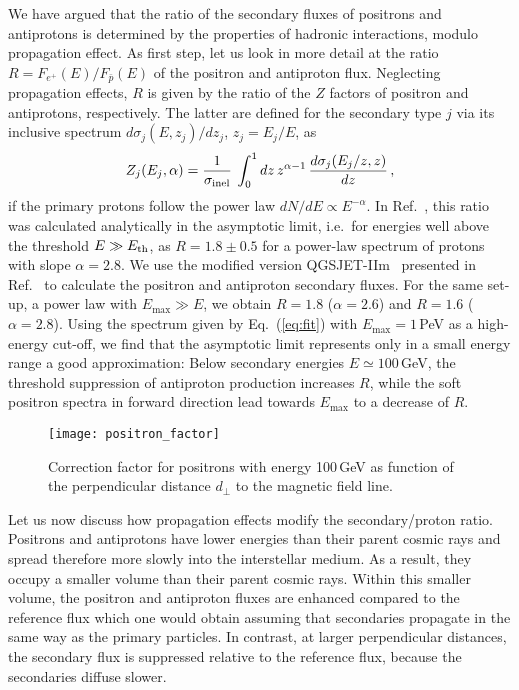\documentclass[prd,aps,twocolumn]{revtex4}
\begin{document}
We have argued that the ratio of the secondary fluxes of positrons and 
antiprotons is determined by the properties of hadronic interactions, 
modulo propagation effect. As first step, 
let us look in more detail at the ratio $R=F_{e^+}(E)/F_{\bar p}(E)$ 
of the positron and antiproton flux. Neglecting propagation effects, $R$ is 
given by the ratio of the $Z$ factors of positron and antiprotons, 
respectively. The latter are defined for the secondary type $j$
via its inclusive spectrum $d\sigma_{j}(E,z_{j})/d z_{j}$, 
$z_{j}=E_{j}/E$, as
%
\begin{equation}
\label{Z_spec}
 Z_{j}(E_{j},\alpha) = \frac{1}{\sigma_{\rm inel}}\:\int_0^1 d z \, z^{\alpha-1}\,
 \frac{d\sigma_{j}(E_{j}/z,z)}{d z}\,,
\end{equation}
%
if the primary protons follow the power law $dN/dE\propto E^{-\alpha}$.
In Ref.~\cite{lipari}, this ratio was calculated  analytically in the 
asymptotic limit, i.e.\ for energies well above the threshold $E\gg E_{\rm th}$, 
as $R=1.8\pm 0.5$  for a power-law spectrum of protons with slope 
$\alpha=2.8$. We use the modified version QGSJET-IIm~\cite{QGS} presented 
in Ref.~\cite{QGSm} to calculate the positron and antiproton secondary fluxes. 
For the same set-up,  a power law with $E_{\max}\gg E$, we obtain 
$R=1.8$ ($\alpha=2.6$) and $R=1.6$ ($\alpha=2.8$). 
Using the spectrum given by Eq.~(\ref{eq:fit}) with  $E_{\max}= 1$\,PeV
as a high-energy cut-off, we find that the asymptotic 
limit represents only in a small energy range a good approximation: Below 
secondary energies $E\simeq 100$\,GeV, the threshold suppression of 
antiproton production increases $R$, while the soft positron spectra in 
forward direction lead towards $E_{\max}$ to a decrease of $R$.


\begin{figure}
\texttt{[image: positron\_factor]}
\caption{Correction factor for positrons with energy 100\,GeV as
function of the perpendicular distance $d_\perp$ to the magnetic field line.}
\label{fig:enhancement}
\end{figure}



Let us now discuss how propagation effects modify the secondary/proton ratio.
Positrons and antiprotons have lower energies than their parent cosmic rays
and spread therefore more slowly into the interstellar medium. As a result, 
they occupy a smaller volume than their parent cosmic rays. Within this 
smaller volume, the positron and antiproton fluxes are enhanced compared to 
the reference flux which one would obtain assuming that secondaries 
propagate in the same way as the primary particles. In contrast, at larger
perpendicular distances, the secondary flux is suppressed relative to
the reference flux, because the secondaries diffuse slower.
\end{document}
